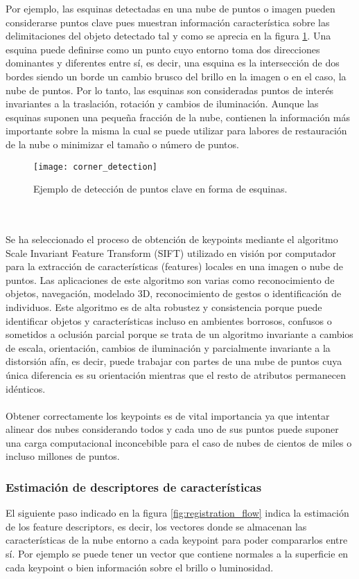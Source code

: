 Por ejemplo, las esquinas detectadas en una nube de puntos o imagen pueden considerarse puntos clave pues muestran información característica\cite{puntos_clave_pwp} sobre las delimitaciones del objeto detectado tal y como se aprecia en la figura \ref{fig:corner_detection}. Una esquina puede definirse como un punto cuyo entorno toma dos direcciones dominantes y diferentes entre sí, es decir, una esquina es la intersección de dos bordes siendo un borde un cambio brusco del brillo en la imagen o en el caso, la nube de puntos. Por lo tanto, las esquinas son consideradas puntos de interés invariantes a la traslación, rotación y cambios de iluminación. 
Aunque las esquinas suponen una pequeña fracción de la nube, contienen la información más importante sobre la misma la cual se puede utilizar para labores de restauración de la nube o minimizar el tamaño o número de puntos.
\begin{figure}
\centering
\texttt{[image: corner\_detection]}
\caption{Ejemplo de detección de puntos clave en forma de esquinas.}\label{fig:corner_detection}
\end{figure}
\\
\\
Se ha seleccionado el proceso de obtención de keypoints mediante el algoritmo Scale Invariant Feature Transform (SIFT)\cite{sift_opencv} utilizado en visión por computador para la extracción de características (features) locales en una imagen o nube de puntos. Las aplicaciones de este algoritmo son varias como reconocimiento de objetos, navegación, modelado 3D, reconocimiento de gestos o identificación de individuos. Este algoritmo es de alta robustez y consistencia porque puede identificar objetos y características incluso en ambientes borrosos, confusos o sometidos a oclusión parcial porque se trata de un algoritmo invariante a cambios de escala, orientación, cambios de iluminación y parcialmente invariante a la distorsión afín, es decir, puede trabajar con partes de una nube de puntos cuya única diferencia es su orientación mientras que el resto de atributos permanecen idénticos.
\\
\\
Obtener correctamente los keypoints es de vital importancia ya que intentar alinear dos nubes considerando todos y cada uno de sus puntos puede suponer una carga computacional inconcebible para el caso de nubes de cientos de miles o incluso millones de puntos. 

\subsubsection{Estimación de descriptores de características}
El siguiente paso indicado en la figura \ref{fig:registration_flow} indica la estimación de los feature descriptors, es decir, los vectores donde se almacenan las características de la nube entorno a cada keypoint para poder compararlos entre sí. Por ejemplo se puede tener un vector que contiene normales a la superficie en cada keypoint o bien información sobre el brillo o luminosidad.

